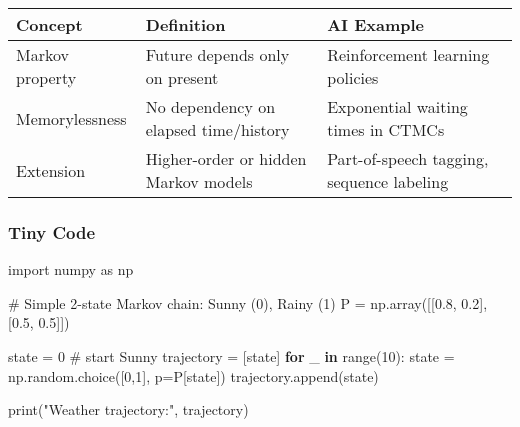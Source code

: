 \documentclass[
  letterpaper,
  DIV=11,
  numbers=noendperiod]{scrreprt}
\newenvironment{Shaded}{\begin{snugshade}}{\end{snugshade}}
\newcommand{\BuiltInTok}[1]{\textcolor[rgb]{0.00,0.23,0.31}{#1}}
\newcommand{\CommentTok}[1]{\textcolor[rgb]{0.37,0.37,0.37}{#1}}
\newcommand{\ControlFlowTok}[1]{\textcolor[rgb]{0.00,0.23,0.31}{\textbf{#1}}}
\newcommand{\DecValTok}[1]{\textcolor[rgb]{0.68,0.00,0.00}{#1}}
\newcommand{\FloatTok}[1]{\textcolor[rgb]{0.68,0.00,0.00}{#1}}
\newcommand{\ImportTok}[1]{\textcolor[rgb]{0.00,0.46,0.62}{#1}}
\newcommand{\KeywordTok}[1]{\textcolor[rgb]{0.00,0.23,0.31}{\textbf{#1}}}
\newcommand{\NormalTok}[1]{\textcolor[rgb]{0.00,0.23,0.31}{#1}}
\newcommand{\OperatorTok}[1]{\textcolor[rgb]{0.37,0.37,0.37}{#1}}
\newcommand{\StringTok}[1]{\textcolor[rgb]{0.13,0.47,0.30}{#1}}
\begin{document}
\begin{longtable}[]{@{}
  >{\raggedright\arraybackslash}p{}
  >{\raggedright\arraybackslash}p{}
  >{\raggedright\arraybackslash}p{}@{}}
\toprule\noalign{}
\begin{minipage}[b]{\linewidth}\raggedright
Concept
\end{minipage} & \begin{minipage}[b]{\linewidth}\raggedright
Definition
\end{minipage} & \begin{minipage}[b]{\linewidth}\raggedright
AI Example
\end{minipage} \\
\midrule\noalign{}
\endhead
\bottomrule\noalign{}
\endlastfoot
Markov property & Future depends only on present & Reinforcement
learning policies \\
Memorylessness & No dependency on elapsed time/history & Exponential
waiting times in CTMCs \\
Extension & Higher-order or hidden Markov models & Part-of-speech
tagging, sequence labeling \\
\end{longtable}

\subsubsection{Tiny Code}\label{tiny-code-176}

\begin{Shaded}
\begin{Highlighting}[]
\ImportTok{import}\NormalTok{ numpy }\ImportTok{as}\NormalTok{ np}

\CommentTok{\# Simple 2{-}state Markov chain: Sunny (0), Rainy (1)}
\NormalTok{P }\OperatorTok{=}\NormalTok{ np.array([[}\FloatTok{0.8}\NormalTok{, }\FloatTok{0.2}\NormalTok{],}
\NormalTok{              [}\FloatTok{0.5}\NormalTok{, }\FloatTok{0.5}\NormalTok{]])}

\NormalTok{state }\OperatorTok{=} \DecValTok{0}  \CommentTok{\# start Sunny}
\NormalTok{trajectory }\OperatorTok{=}\NormalTok{ [state]}
\ControlFlowTok{for}\NormalTok{ \_ }\KeywordTok{in} \BuiltInTok{range}\NormalTok{(}\DecValTok{10}\NormalTok{):}
\NormalTok{    state }\OperatorTok{=}\NormalTok{ np.random.choice([}\DecValTok{0}\NormalTok{,}\DecValTok{1}\NormalTok{], p}\OperatorTok{=}\NormalTok{P[state])}
\NormalTok{    trajectory.append(state)}

\BuiltInTok{print}\NormalTok{(}\StringTok{"Weather trajectory:"}\NormalTok{, trajectory)}
\end{Highlighting}
\end{Shaded}
\end{document}
